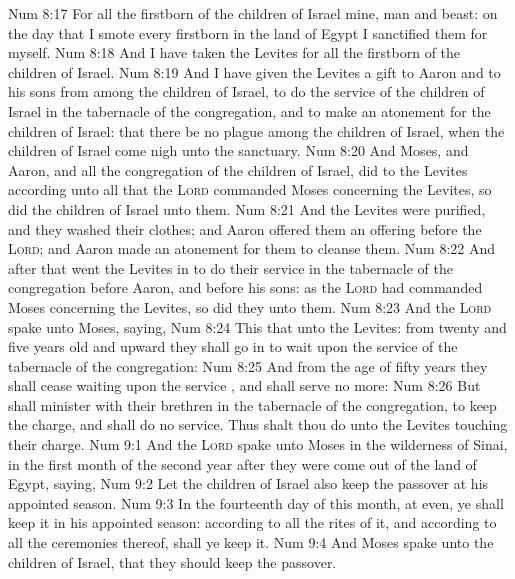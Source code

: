 \vs Num 8:17 For all the firstborn of the children of Israel  mine,  man and beast: on the day that I smote every firstborn in the land of Egypt I sanctified them for myself.
\vs Num 8:18 And I have taken the Levites for all the firstborn of the children of Israel.
\vs Num 8:19 And I have given the Levites  a gift to Aaron and to his sons from among the children of Israel, to do the service of the children of Israel in the tabernacle of the congregation, and to make an atonement for the children of Israel: that there be no plague among the children of Israel, when the children of Israel come nigh unto the sanctuary.
\vs Num 8:20 And Moses, and Aaron, and all the congregation of the children of Israel, did to the Levites according unto all that the \textsc{Lord} commanded Moses concerning the Levites, so did the children of Israel unto them.
\vs Num 8:21 And the Levites were purified, and they washed their clothes; and Aaron offered them  an offering before the \textsc{Lord}; and Aaron made an atonement for them to cleanse them.
\vs Num 8:22 And after that went the Levites in to do their service in the tabernacle of the congregation before Aaron, and before his sons: as the \textsc{Lord} had commanded Moses concerning the Levites, so did they unto them.
\vs Num 8:23 And the \textsc{Lord} spake unto Moses, saying,
\vs Num 8:24 This  that  unto the Levites: from twenty and five years old and upward they shall go in to wait upon the service of the tabernacle of the congregation:
\vs Num 8:25 And from the age of fifty years they shall cease waiting upon the service , and shall serve no more:
\vs Num 8:26 But shall minister with their brethren in the tabernacle of the congregation, to keep the charge, and shall do no service. Thus shalt thou do unto the Levites touching their charge.
\vs Num 9:1 And the \textsc{Lord} spake unto Moses in the wilderness of Sinai, in the first month of the second year after they were come out of the land of Egypt, saying,
\vs Num 9:2 Let the children of Israel also keep the passover at his appointed season.
\vs Num 9:3 In the fourteenth day of this month, at even, ye shall keep it in his appointed season: according to all the rites of it, and according to all the ceremonies thereof, shall ye keep it.
\vs Num 9:4 And Moses spake unto the children of Israel, that they should keep the passover.
